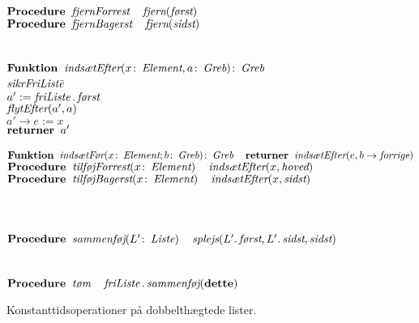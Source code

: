 \begin{figure}
\begin{tabbing}
    \>$\Procedure \varname{fjernForrest} \quad\varname{fjern}(\varname{først})$\\
    \>$\Procedure \varname{fjernBagerst} \quad\varname{fjern}(\varname{sidst})$\\
    \\
    \>\\
    \>$\Function \varname{indsætEfter}(x\colon\Element, a\colon\Handle)\colon \Handle$ \\
    \>\>$\varname{sikrFriListe}$\hspace{2cm}\=\\
    \>\>$a':=\varname{friListe}.\varname{først}$\>\\
    \>\>$\varname{flytEfter}(a',a)$\>\\
    \>\>$a'\rightarrow e:= x$\>\\
    \>\>$\return a'$\\
    \\
    \>$\Function\varname{indsætFør}(x\colon\Element; b\colon\Handle)\colon\Handle \quad \return\varname{indsætEfter}(e, b\rightarrow\varname{forrige})$\\
    \>$\Procedure\varname{tilføjForrest}(x\colon\Element) \quad \varname{indsætEfter}(x, \varname{hoved})$\\
    \>$\Procedure\varname{tilføjBagerst}(x\colon\Element) \quad \varname{indsætEfter}(x, \varname{sidst})$\\
    \\
    \>\\
    \>\\
    \>$\Procedure\varname{sammenføj}(L'\colon\varname{Liste})\quad 
    \varname{splejs}(L'.\varname{først}, L'.\varname{sidst},\varname{sidst})$\\
    \\
    \>\\
    \>$\Procedure\varname{tøm}\quad \varname{friListe}.\varname{sammenføj}(\this)$
  \end{tabbing}
  \caption{Konstanttidsoperationer på dobbelthægtede lister.}
\end{figure}
